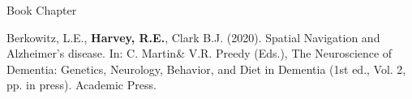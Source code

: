 \begin{cventries}
\cventry
    {Book Chapter} %
    {} %
    {} %
    {} %
    {
      \begin{cvitems} %
      \setlength\itemsep{0.5em}
          \item {Berkowitz, L.E., \textbf{Harvey, R.E.}, Clark B.J. (2020). Spatial Navigation and Alzheimer’s disease. In: C. Martin\& V.R. Preedy (Eds.), The Neuroscience of Dementia: Genetics, Neurology, Behavior, and Diet in Dementia (1st ed., Vol. 2, pp. in press). Academic Press.}
      \end{cvitems}
    }
\end{cventries}    
    
